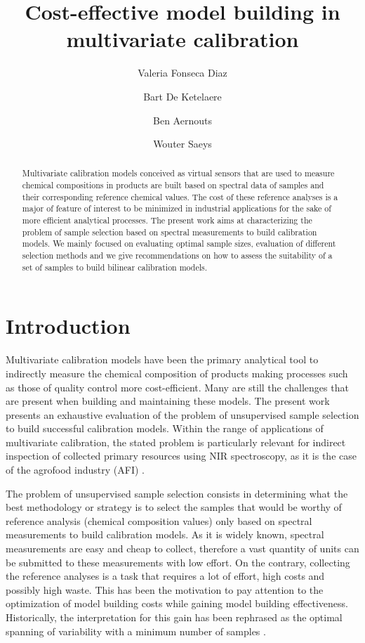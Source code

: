 \documentclass[journal=ancham,manuscript=article]{achemso}
\author{Valeria Fonseca Diaz}
\author{Bart De Ketelaere}
\author{Ben Aernouts}
\author{Wouter Saeys}
\affiliation[KU Leuven]
{KU Leuven, Kasteelpark
Arenberg 30, Leuven, Belgium}
\title[An \textsf{achemso} demo]
  {Cost-effective model building in multivariate calibration}
\begin{document}
\begin{abstract}
Multivariate calibration models conceived as virtual sensors that are used to measure chemical compositions in products are built based on spectral data of samples and their corresponding reference chemical values. The cost of these reference analyses is a major of feature of interest to be minimized in industrial applications for the sake of more efficient analytical processes. The present work aims at characterizing the problem of sample selection based on spectral measurements to build calibration models. We mainly focused on evaluating optimal sample sizes, evaluation of different selection methods and we give recommendations on how to assess the suitability of a set of samples to build bilinear calibration models.
\end{abstract}%


\section{Introduction}\label{introduction}

Multivariate calibration models have been the primary analytical tool to indirectly measure the chemical composition of products making processes such as those of quality control more cost-efficient. Many are still the challenges that are present when building and maintaining these models. The present work presents an exhaustive evaluation of the problem of unsupervised sample selection to build successful calibration models. Within the range of applications of multivariate calibration, the stated problem is particularly relevant for indirect inspection of collected primary resources using NIR spectroscopy, as it is the case of the agrofood industry (AFI) \cite{Au2020,Diaz-Olivares2020, Saeys2005, Bobelyn2010}.  

The problem of unsupervised sample selection consists in determining what the best methodology or strategy is to select the samples that would be worthy of reference analysis (chemical composition values) only based on spectral measurements to build calibration models. As it is widely known, spectral measurements are easy and cheap to collect, therefore a vast quantity of units can be submitted to these measurements with low effort. On the contrary, collecting the reference analyses is a task that requires a lot of effort, high costs and possibly high waste. This has been the motivation to pay attention to the optimization of model building costs while gaining model building effectiveness. Historically, the interpretation for this gain has been rephrased as the optimal spanning of variability with a minimum number of samples \cite{Naes1990, Saeys2019,Kennard1969}.
\end{document}
